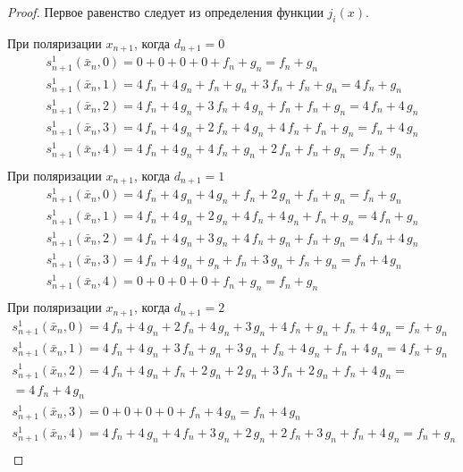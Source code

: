 \documentclass[bibliography=totoc, a4paper, 14pt]{extarticle}
\begin{document}
 \begin{proof}

Первое равенство следует из определения функции $j_i(x)$.

При поляризации $x_{n+1}$, когда $d_{n+1} = 0$
$$\begin{array}{l}
s_{n+1}^1(\bar{x}_n, 0) = 0 + 0 + 0 + 0 + f_n + g_n = f_n + g_n \\
s_{n+1}^1(\bar{x}_n, 1) = 4\,f_n + 4\,g_n + f_n + g_n + 3\,f_n + f_n + g_n = 4\,f_n + g_n \\
s_{n+1}^1(\bar{x}_n, 2) = 4\,f_n + 4\,g_n + 3\,f_n + 4\,g_n + f_n + f_n + g_n = 4\,f_n + 4\,g_n \\
s_{n+1}^1(\bar{x}_n, 3) = 4\,f_n + 4\,g_n + 2\,f_n + 4\,g_n + 4\,f_n + f_n + g_n = f_n + 4\,g_n \\
s_{n+1}^1(\bar{x}_n, 4) = 4\,f_n + 4\,g_n + 4\,f_n + g_n + 2\,f_n + f_n + g_n = f_n + g_n \\
\end{array}$$
При поляризации $x_{n+1}$, когда $d_{n+1} = 1$
$$\begin{array}{l}
s_{n+1}^1(\bar{x}_n, 0) = 4\,f_n + 4\,g_n + 4\,g_n + f_n + 2\,g_n + f_n + g_n = f_n + g_n \\
s_{n+1}^1(\bar{x}_n, 1) = 4\,f_n + 4\,g_n + 2\,g_n + 4\,f_n + 4\,g_n + f_n + g_n = 4\,f_n + g_n \\
s_{n+1}^1(\bar{x}_n, 2) = 4\,f_n + 4\,g_n + 3\,g_n + 4\,f_n + g_n + f_n + g_n = 4\,f_n + 4\,g_n \\
s_{n+1}^1(\bar{x}_n, 3) = 4\,f_n + 4\,g_n + g_n + f_n + 3\,g_n + f_n + g_n = f_n + 4\,g_n \\
s_{n+1}^1(\bar{x}_n, 4) = 0 + 0 + 0 + 0 + f_n + g_n = f_n + g_n \\
\end{array}$$
При поляризации $x_{n+1}$, когда $d_{n+1} = 2$
$$\begin{array}{l}
s_{n+1}^1(\bar{x}_n, 0) = 4\,f_n + 4\,g_n + 2\,f_n + 4\,g_n + 3\,g_n + 4\,f_n + g_n + f_n + 4\,g_n = f_n + g_n \\
s_{n+1}^1(\bar{x}_n, 1) = 4\,f_n + 4\,g_n + 3\,f_n + g_n + 3\,g_n + f_n + 4\,g_n + f_n + 4\,g_n = 4\,f_n + g_n \\
s_{n+1}^1(\bar{x}_n, 2) = 4\,f_n + 4\,g_n + f_n + 2\,g_n + 2\,g_n + 3\,f_n + 2\,g_n + f_n + 4\,g_n = \\
= 4\,f_n + 4\,g_n \\
s_{n+1}^1(\bar{x}_n, 3) = 0 + 0 + 0 + 0 + f_n + 4\,g_n = f_n + 4\,g_n \\
s_{n+1}^1(\bar{x}_n, 4) = 4\,f_n + 4\,g_n + 4\,f_n + 3\,g_n + 2\,g_n + 2\,f_n + 3\,g_n + f_n + 4\,g_n = f_n + g_n \\

\end{array}$$
\end{proof}
\end{document}
